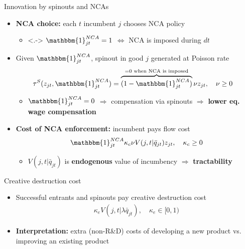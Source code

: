 \documentclass[english,usenames,dvipsnames]{beamer}
\begin{document}
\begin{frame}{Innovation by spinouts and NCAs}
	\begin{itemize}
		\item<+-> \alert{\textbf{NCA choice:}} each $t$ incumbent $j$ chooses NCA policy
		\begin{itemize}
			\item<.-> $\mathbbm{1}^{NCA}_{jt} = 1$ $\Leftrightarrow$ NCA is imposed during $dt$
		\end{itemize}
		\medskip
		\item<+-> Given $\mathbbm{1}^{NCA}_{jt}$, spinout in good $j$ generated at Poisson rate
		\begin{align*}
		\tau^S(z_{jt},\mathbbm{1}^{NCA}_{jt}) &= \overbrace{(1-\mathbbm{1}_{jt}^{NCA})}^{\mathclap{= 0 \text{ when NCA is imposed}}} \nu z_{jt}, \quad \nu \ge 0
		\end{align*}
		\begin{itemize}
			\item<+-> $\mathbbm{1}^{NCA}_{jt} = 0$ $\Rightarrow$ compensation via spinouts $\Rightarrow$ \alert{\textbf{lower eq. wage compensation}}
		\end{itemize}
		\medskip
		\item<+-> \alert{\textbf{Cost of NCA enforcement:}} incumbent pays flow cost 
		\begin{align*}
			\mathbbm{1}^{NCA}_{jt} \kappa_c \nu V(j,t | \bar{q}_{jt}) z_{jt}, \quad \kappa_c \ge 0
		\end{align*} 
		\begin{itemize}
			\item<+-> $V(j,t|\bar{q}_{jt})$ is \alert{\textbf{endogenous}} value of incumbency $\Rightarrow$ \alert{\textbf{tractability}} 
		\end{itemize}
	\end{itemize}
\end{frame}

\begin{frame}{Creative destruction cost}
	\begin{itemize}
		\item Successful entrants and spinouts pay creative destruction cost
		\begin{align*}
			\kappa_e V(j,t|\lambda \bar{q}_{jt}), \quad \kappa_e \in [0,1)
		\end{align*}
		\item \alert{\textbf{Interpretation:}} extra (non-R\&D) costs of developing a new product vs. improving an existing product
	\end{itemize}
\end{frame}
\end{document}
